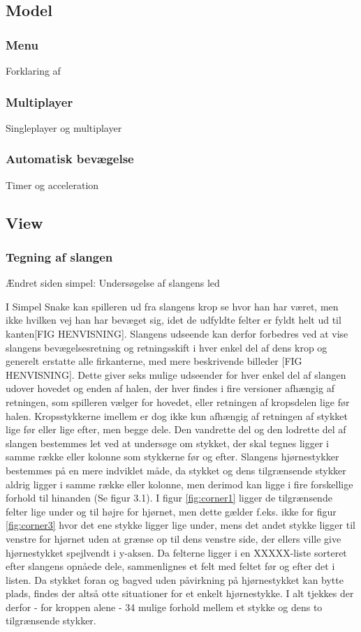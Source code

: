 \documentclass{report}
\begin{document}
\subsection{Model}
\subsubsection{Menu}
Forklaring af

\subsubsection{Multiplayer}
Singleplayer og multiplayer

\subsubsection{Automatisk bevægelse}
Timer og acceleration


\subsection{View}
\subsubsection{Tegning af slangen}
Ændret siden simpel: Undersøgelse af slangens led

I Simpel Snake kan spilleren ud fra slangens krop se hvor han har været, men ikke hvilken vej han har bevæget sig, idet de udfyldte felter er fyldt helt ud til kanten[FIG HENVISNING]. Slangens udseende kan derfor forbedres ved at vise slangens bevægelsesretning og retningsskift i hver enkel del af dens krop og generelt erstatte alle firkanterne, med mere beskrivende billeder [FIG HENVISNING]. Dette giver seks mulige udseender for hver enkel del af slangen udover hovedet og enden af halen, der hver findes i fire versioner afhængig af retningen, som spilleren vælger for hovedet, eller retningen af kropsdelen lige før halen. Kropsstykkerne imellem er dog ikke kun afhængig af retningen af stykket lige før eller lige efter, men begge dele. Den vandrette del og den lodrette del af slangen bestemmes let ved at undersøge om stykket, der skal tegnes ligger i samme række eller kolonne som stykkerne før og efter. Slangens hjørnestykker bestemmes på en mere indviklet måde, da stykket og dens tilgrænsende stykker aldrig ligger i samme række eller kolonne, men derimod kan ligge i fire forskellige forhold til hinanden (Se figur 3.1). I figur \ref{fig:corner1} ligger de tilgrænsende felter lige under og til højre for hjørnet, men dette gælder f.eks. ikke for figur \ref{fig:corner3} hvor det ene stykke ligger lige under, mens det andet stykke ligger til venstre for hjørnet uden at grænse op til dens venstre side, der ellers ville give hjørnestykket spejlvendt i y-aksen. Da felterne ligger i en XXXXX-liste sorteret efter slangens opnåede dele, sammenlignes et felt med feltet før og efter det i listen. Da stykket foran og bagved uden påvirkning på hjørnestykket kan bytte plads, findes der altså otte situationer for et enkelt hjørnestykke. I alt tjekkes der derfor - for kroppen alene - 34 mulige forhold mellem et stykke og dens to tilgrænsende stykker.
\linebreak
\end{document}
